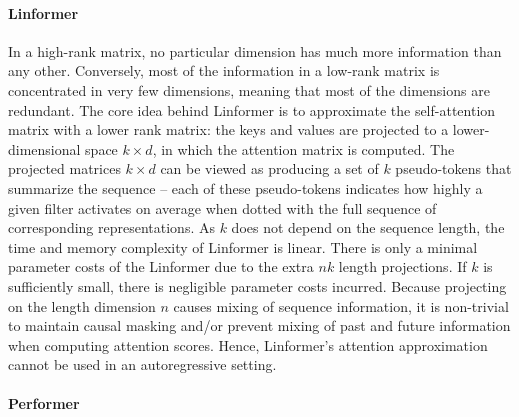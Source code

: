 \paragraph{Linformer} 

In a high-rank matrix, no particular dimension has much more information than any other. Conversely, most of the information in a low-rank matrix is concentrated in very few dimensions, meaning that most of the dimensions are redundant. The core idea behind Linformer \citep{wang2020linformer} is to approximate the self-attention matrix with a lower rank matrix: the keys and values are projected to a lower-dimensional space $k \times d$, in which the attention matrix is computed. The projected matrices $k \times d$ can be viewed as producing a set of $k$ pseudo-tokens that summarize the sequence – each of these pseudo-tokens indicates how highly a given filter activates on average when dotted with the full sequence of corresponding representations. As $k$ does not depend on the sequence length, the time and memory complexity of Linformer is linear. There is only a minimal parameter costs of the Linformer due to the extra $nk$ length projections. If $k$ is sufficiently small, there is negligible parameter costs incurred. Because projecting on the length dimension $n$ causes mixing of sequence information, it is non-trivial to maintain causal masking and/or prevent mixing of past and future information when computing attention scores. Hence, Linformer's attention approximation cannot be used in an autoregressive setting.


\paragraph{Performer}

